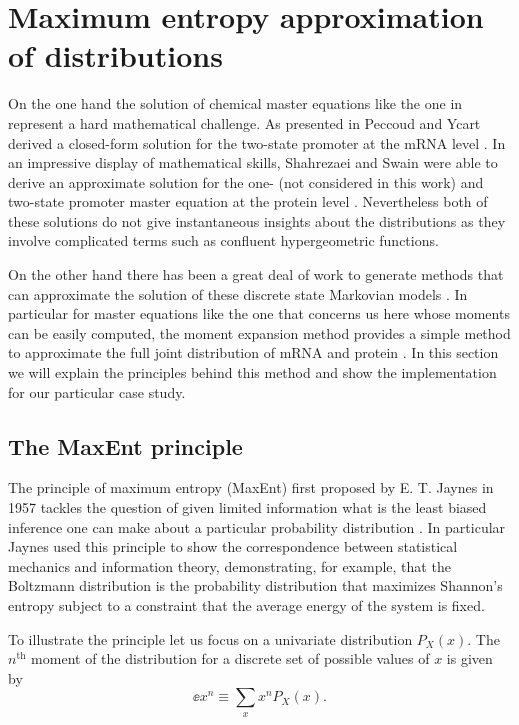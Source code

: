 \section{Maximum entropy approximation of distributions}\label{supp_maxent}

On the one hand the solution of chemical master equations like the one
in  represent a hard mathematical challenge. As presented
in  Peccoud and Ycart derived a closed-form solution
for the two-state promoter at the mRNA level \cite{Peccoud1995}. In an
impressive display of mathematical skills, Shahrezaei and Swain were able to
derive an approximate solution for the one- (not considered in this work) and
two-state promoter master equation at the protein level \cite{Shahrezaei2008}.
Nevertheless both of these solutions do not give instantaneous insights about
the distributions as they involve complicated terms such as confluent
hypergeometric functions.

On the other hand there has been a great deal of work to generate methods that
can approximate the solution of these discrete state Markovian models
\cite{Ale2013, Andreychenko2017, Frohlich2016, Schnoerr2017, Smadbeck2013}. In particular for master equations like the one that
concerns us here whose moments can be easily computed, the moment expansion
method provides a simple method to approximate the full joint distribution of
mRNA and protein \cite{Smadbeck2013}. In this section we will explain the
principles behind this method and show the implementation for our particular
case study.

\subsection{The MaxEnt principle}

The principle of maximum entropy (MaxEnt) first proposed by E. T. Jaynes in 1957
tackles the question of given limited information what is the least biased
inference one can make about a particular probability distribution
\cite{Jaynes1957}. In particular Jaynes used this principle to show the
correspondence between statistical mechanics and information theory,
demonstrating, for example, that the Boltzmann distribution is the probability
distribution that maximizes Shannon's entropy subject to a constraint that the
average energy of the system is fixed.

To illustrate the principle let us focus on a univariate distribution $P_X(x)$.
The $n^{\text{th}}$ moment of the distribution for a discrete set of possible
values of $x$ is given by
\begin{equation}
  \ee{x^n} \equiv \sum_x x^n P_X(x).
  \label{eq_mom_ref}
\end{equation}

